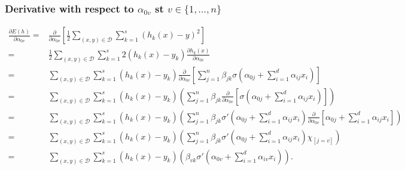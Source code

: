 \begin{frame}
  \frametitle{Derivative with respect to $\alpha_{0 v}$ st $v \in \{1, \ldots, n\}$}
  {\tiny 
  \begin{align} \label{eq:parcial_alpha_cero}
        \frac{\partial E(h)}{\partial \alpha_{0 v}} 
        = &
        \frac{\partial}{\partial \alpha_{0 v}}
        \left[
            \frac{1}{2}
            \sum_{(x,y) \in \mathcal{D}}
            \sum_{k = 1}^s 
            \left(h_k(x) - y\right)^2
        \right]
        \\ %
        = &
        \frac{1}{2}
        \sum_{(x,y) \in \mathcal{D}}
        \sum_{k = 1}^s 
        2 \left(h_k(x) - y_k \right)
        \frac{\partial h_k(x)}{\partial \alpha_{0 v}} 
        \\ 
        = & %
        \sum_{(x,y) \in \mathcal{D}}
        \sum_{k = 1}^s 
        \left(h_k(x) - y_k \right)
        \frac{\partial}{\partial \alpha_{0 v}} 
        \left[
            \sum_{j = 1}^n 
                \beta_{j k}
                \sigma
                \left(  
                    \alpha_{0 j} +
                    \sum_{i=1}^d \alpha_{i j}x_i
                \right)
        \right] 
        \\ 
        = & %
        \sum_{(x,y) \in \mathcal{D}}
        \sum_{k = 1}^s 
        \left(h_k(x) - y_k \right)
        \left(
            \sum_{j = 1}^n 
            \beta_{j k}
            \frac{\partial}{\partial \alpha_{0 v}} 
            \left[
                \sigma
                \left(  
                    \alpha_{0 j} +
                    \sum_{i=1}^d \alpha_{i j}x_i
                \right)
            \right]
        \right) 
        \\ 
        = & %
        \sum_{(x,y) \in \mathcal{D}}
        \sum_{k = 1}^s 
        \left(h_k(x) - y_k \right)
        \left(
            \sum_{j = 1}^n 
            \beta_{j k}
            \sigma '
            \left(  
                \alpha_{0 j} +
                \sum_{i=1}^d \alpha_{i j}x_i
            \right)
            \frac{\partial}{\partial \alpha_{0 v}}    
            \left[
                \alpha_{0 j} +
                \sum_{i=1}^d \alpha_{i j}x_i
            \right]
        \right) 
        \\ 
        = & %
        \sum_{(x,y) \in \mathcal{D}}
        \sum_{k = 1}^s 
        \left(h_k(x) - y_k \right)
        \left(
            \sum_{j = 1}^n 
            \beta_{j k}
            \sigma '
            \left(  
                \alpha_{0 j} +
                \sum_{i=1}^d \alpha_{i j}x_i
            \right)   
            \chi_{[j = v]}
        \right) 
        \\ 
        = & %
        \sum_{(x,y) \in \mathcal{D}}
        \sum_{k = 1}^s 
        \left(h_k(x) - y_k \right)
        \left(
            \beta_{v k}
            \sigma '
            \left(  
                \alpha_{0 v} +
                \sum_{i=1}^d \alpha_{i v}x_i
            \right)   
        \right). 
    \end{align}
  }
\end{frame}

